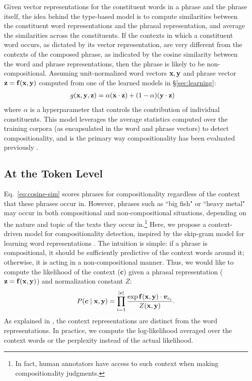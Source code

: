 \documentclass[11pt,letterpaper]{article}
\newcommand{\bX}{{\bf x}}
\newcommand{\bY}{{\bf y}}
\newcommand{\bZ}{{\bf z}}
\newcommand{\bF}{{\bf f}}
\begin{document}
Given vector representations for the constituent words in a phrase and the phrase itself, the idea behind the type-based model is to compute similarities between the constituent word representations and the phrasal representation, and average the similarities across the constituents. 
If the contexts in which a constituent word occurs, as dictated by its vector representation, are very different from the contexts of the composed phrase, as indicated by the cosine similarity between the word and phrase representations, then the phrase is likely to be non-compositional. 
Assuming unit-normalized word vectors $\bX, \bY$ and phrase vector $\bZ = \bF(\bX, \bY)$ computed from one of the learned models in \S\ref{sec:learning}:
\begin{align}
	g(\bX, \bY, \bZ) &= \alpha (\bX \cdot \bZ) + (1-\alpha)(\bY \cdot \bZ)
	\label{eq:cosine-sim}
\end{align}
where $\alpha$ is a hyperparameter that controls the contribution of individual constituents. 
This model leverages the average statistics computed over the training corpora (as encapsulated in the word and phrase vectors) to detect compositionality, and is the primary way compositionality has been evaluated previously \cite{Reddy2011,Kiela2013}. 

\subsection{At the Token Level}
\label{sec:context}

Eq.~\ref{eq:cosine-sim} scores phrases for compositionality regardless of the context that these phrases occur in. 
However, phrases such as ``big fish" or ``heavy metal" may occur in both compositional and non-compositional situations, depending on the nature and topic of the texts they occur in.\footnote{In fact, human annotators have access to such context when making compositionality judgments.}
Here, we propose a context-driven model for compositionality detection, inspired by the skip-gram model for learning word representations \cite{Mikolov2013b}. 
The intuition is simple: if a phrase is compositional, it should be sufficiently predictive of the context words around it; otherwise, it is acting in a non-compositional manner. 
Thus, we would like to compute the likelihood of the context ($\boldsymbol{c}$) given a phrasal representation ($\bZ = \bF(\bX, \bY)$) and normalization constant $Z$:
\begin{align}
	P(\boldsymbol{c} \mid \bX,\bY) = \prod_{i=1}^{|\boldsymbol{c}|} \frac{\exp \bF(\bX,\bY) \cdot \boldsymbol{v}_{c_i}}{Z(\bX,\bY)}.
	\label{eq:likelihood}
\end{align}
As explained in , the context representations are distinct from the word representations.
In practice, we compute the log-likelihood averaged over the context words or the perplexity instead of the actual likelihood. 
\end{document}
